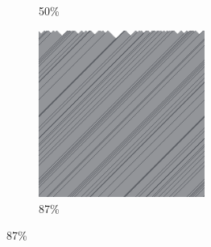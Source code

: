 \documentclass[12pt, fleqn]{report}                             %
\theoremstyle{break}                                            %
\begin{document}
\begin{figure}[ht!]
\begin{subfigure}[b]{0.4\linewidth}
          \caption{50\%}
        \end{subfigure}
        \begin{subfigure}[b]{0.4\linewidth}
          \includegraphics[width=0.6\textwidth]{Images/162/d.png}
          \caption{87\%}
        \end{subfigure}
      \end{figure}
\end{document}
